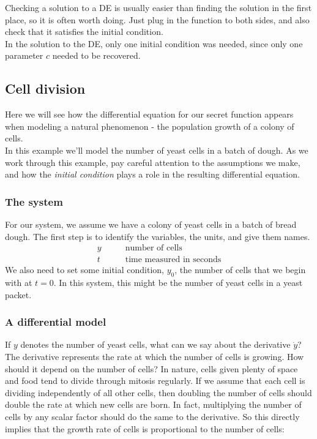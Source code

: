\Important Checking a solution to a DE is usually easier
than finding the solution in the first place, so it is often worth doing.
Just plug in the function to both sides, and also check that it satisfies the initial condition.\\

In the solution to the DE, only one initial condition was needed,
since only one parameter $c$ needed to be recovered.
\clearpage

\subsection{Cell division}
Here we will see how the differential equation for our secret function appears when modeling a natural phenomenon - the population growth of a colony of cells.\\

In this example we'll model the number of yeast cells in a batch of dough.
As we work through this example, pay careful attention to the assumptions we make, and how the \emph{\color{blue} initial condition} plays a role in the resulting differential equation.

\subsubsection{\color{blue} The system}
For our system, we assume we have a colony of yeast cells in a batch of bread dough.
The first step is to identify the variables, the units, and give them names.
\begin{align*}
  y\qquad &\text{number of cells}\\
  t\qquad &\text{time measured in seconds}
\end{align*}
We also need to set some initial condition, $y_0$, the number of cells that we begin with at $t=0$.
In this system, this might be the number of yeast cells in a yeast packet.
\subsubsection{\color{blue} A differential model}
If $y$ denotes the number of yeast cells, what can we say about the derivative $\dot{y}$?
The derivative represents the rate at which the number of cells is growing.
How should it depend on the number of cells?
In nature, cells given plenty of space and food tend to divide through mitosis regularly.
If we assume that each cell is dividing independently of all other cells, then doubling the number of cells should double the rate at which new cells are born.
In fact, multiplying the number of cells by any scalar factor should do the same to the derivative.
So this directly implies that the growth rate of cells is proportional to the number of cells:

